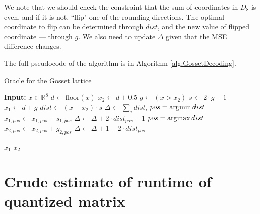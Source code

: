 We note that we should check the constraint that the sum of coordinates in $D_8$ is even, and if it is not, ``flip" one of the rounding directions. The optimal coordinate to flip can be determined through $dist$, and the new value of flipped coordinate --- through $g$. We also need to update $\Delta$ given that the MSE difference changes.

The full pseudocode of the algorithm is in Algorithm \ref{alg:GossetDecoding}.

\begin{algorithm}[H]
\caption{Oracle for the Gosset lattice}
\label{alg:GossetDecoding}
\begin{algorithmic}[1]

\State \textbf{Input:} $x \in \mathbb{R}^8$
\State $d \leftarrow \text{floor}(x)$
\State $x_2 \leftarrow d + 0.5$
\State $g \leftarrow (x > x_2)$
\State $s \leftarrow 2 \cdot g - 1$
\State $x_1 \leftarrow d + g$
\State $dist \leftarrow (x - x_2) \cdot s$
\State $\Delta \leftarrow \sum_i dist_i$
    \State $pos = \operatorname*{\arg\!\min} dist$
    \State $x_{1, pos} \leftarrow x_{1, pos} - s_{1, pos}$
    \State $\Delta \leftarrow \Delta + 2 \cdot dist_{pos} - 1$
\EndIf
{}
    \State $pos = \operatorname*{\arg\!\max} dist$
    \State $x_{2, pos} \leftarrow x_{2, pos} + g_{2, pos}$
    \State $\Delta \leftarrow \Delta + 1 - 2 \cdot dist_{pos}$
\EndIf

   \State \Return $x_1$
\Else
   \State \Return $x_2$
\EndIf

\end{algorithmic}
\end{algorithm}





\section{Crude estimate of runtime of quantized matrix}

\label{sec:runtime}

